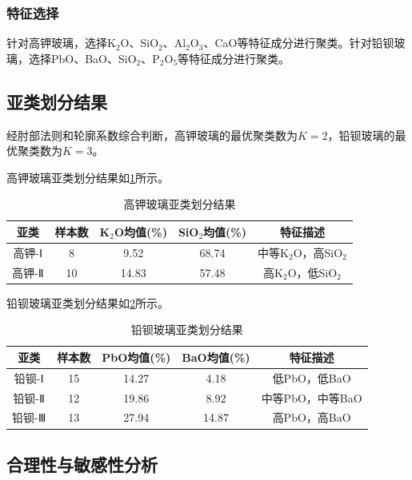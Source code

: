 \documentclass{cumcmthesis}
\begin{document}
\subsubsection{特征选择}
针对高钾玻璃，选择K$_2$O、SiO$_2$、Al$_2$O$_3$、CaO等特征成分进行聚类。针对铅钡玻璃，选择PbO、BaO、SiO$_2$、P$_2$O$_5$等特征成分进行聚类。

\subsection{亚类划分结果}

经肘部法则和轮廓系数综合判断，高钾玻璃的最优聚类数为$K=2$，铅钡玻璃的最优聚类数为$K=3$。

高钾玻璃亚类划分结果如\cref{tab:gaojia_cluster}所示。

\begin{table}[!htbp]
    \centering
    \caption{高钾玻璃亚类划分结果}
    \label{tab:gaojia_cluster}
    \begin{tabular}{c|c|c|c|c}
        \toprule[1.5pt]
        亚类 & 样本数 & K$_2$O均值(\%) & SiO$_2$均值(\%) & 特征描述 \\
        \midrule[1pt]
        高钾-Ⅰ & 8 & 9.52 & 68.74 & 中等K$_2$O，高SiO$_2$ \\
        高钾-Ⅱ & 10 & 14.83 & 57.48 & 高K$_2$O，低SiO$_2$ \\
        \bottomrule[1.5pt]
    \end{tabular}
\end{table}

铅钡玻璃亚类划分结果如\cref{tab:qianbei_cluster}所示。

\begin{table}[!htbp]
    \centering
    \caption{铅钡玻璃亚类划分结果}
    \label{tab:qianbei_cluster}
    \begin{tabular}{c|c|c|c|c}
        \toprule[1.5pt]
        亚类 & 样本数 & PbO均值(\%) & BaO均值(\%) & 特征描述 \\
        \midrule[1pt]
        铅钡-Ⅰ & 15 & 14.27 & 4.18 & 低PbO，低BaO \\
        铅钡-Ⅱ & 12 & 19.86 & 8.92 & 中等PbO，中等BaO \\
        铅钡-Ⅲ & 13 & 27.94 & 14.87 & 高PbO，高BaO \\
        \bottomrule[1.5pt]
    \end{tabular}
\end{table}

\subsection{合理性与敏感性分析}
\end{document}
